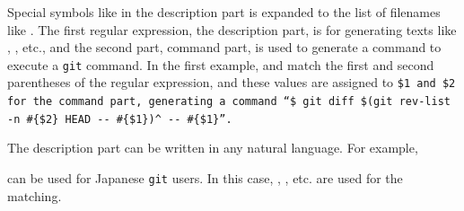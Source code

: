 \documentclass[manuscript,screen,review]{acmart}
\def\GIT{\texttt{git}}
\begin{document}
Special symbols like  in the description part is expanded to
the list of filenames like .
The first regular expression, the description part,
is for generating texts like
, 
, etc.,
and the second part, command part,
is used to generate a command to execute a {\GIT} command.
In the first example,  and 
match the first and second parentheses of the regular expression, and
these values are assigned to \tt{\$1} and \tt{\$2}
for the command part, generating a command
``{\smallfont\verb|$ git diff $(git rev-list -n #{$2} HEAD -- #{$1})^|}
{\smallfont\verb|-- #{$1}|}''.

The description part can be written in any natural language.
For example,

\begin{quote}
\end{quote}
  
can be used for Japanese {\GIT} users.
In this case,
,
, etc.
are used for the matching.
\end{document}

